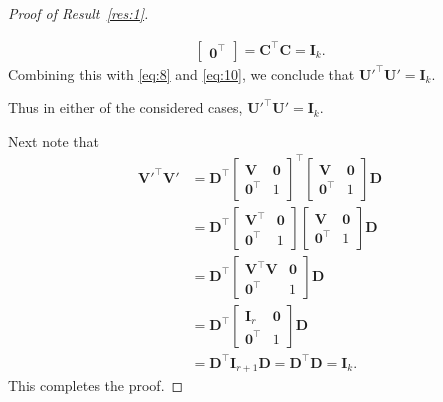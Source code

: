 \documentclass[11pt,a4paper]{article}
\theoremstyle{break}
\numberwithin{dummy}{section}
\theoremstyle{plain}
\theoremstyle{plain}
\theoremstyle{plain}
\theoremstyle{plain}
\theoremstyle{plain}
\theoremstyle{MyNonumberplain}
\newtheorem{proof}{Proof}
\newcommand{\0}{\M{0}}
\newcommand{\M}[1]{\mathbf{#1}}
\newcommand{\T}{\top}
\begin{document}
\begin{proof}[Proof of Result~\ref{res:1}]
\begin{enumerate}[font=\upshape,label=(\roman*),wide,align=right]
\begin{align*}
\begin{bmatrix}
             \0^\T
           \end{bmatrix}
      = \M{C}^\T \M{C} = \M{I}_k.
    \end{align*}
    Combining this with \eqref{eq:8} and \eqref{eq:10}, we conclude that
    \begin{math}
      \M{U}'^\T \M{U}' = \M{I}_k.
    \end{math}
  \end{enumerate}
  Thus in either of the considered cases, 
  \begin{math}
    \M{U}'^\T \M{U}' = \M{I}_k.
  \end{math}
  
  Next note that
  \begin{align*}
    \M{V}'^\T \M{V}'
    &
      =
      \M{D}^\T
      \begin{bmatrix}
        \M{V} & \0
        \\
        \0^\T & 1
      \end{bmatrix}^\T
               \begin{bmatrix}
                 \M{V} & \0
                 \\
                 \0^\T & 1
               \end{bmatrix}
                        \M{D}
    \\
    & =
      \M{D}^\T
      \begin{bmatrix}
        \M{V}^\T & \0
        \\
        \0^\T & 1
      \end{bmatrix}
               \begin{bmatrix}
                 \M{V} & \0
                 \\
                 \0^\T & 1
               \end{bmatrix}
                        \M{D}
    \\
    & =
      \M{D}^\T
      \begin{bmatrix}
        \M{V}^\T \M{V} & \0
        \\
        \0^\T & 1
      \end{bmatrix}
               \M{D}
    \\
    & =
      \M{D}^\T
      \begin{bmatrix}
        \M{I}_r & \0
        \\
        \0^\T & 1
      \end{bmatrix}
               \M{D}
    \\
    & =
      \M{D}^\T \M{I}_{r+1} \M{D}
      = \M{D}^\T \M{D}
      = \M{I}_k.
  \end{align*}
  This completes the proof.
\end{proof}
\end{document}
